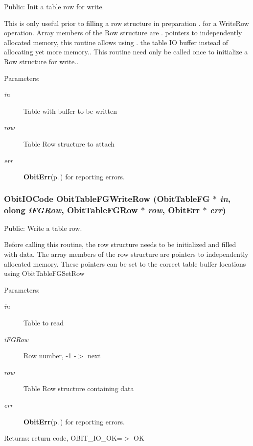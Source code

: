 Public: Init a table row for write. 

This is only useful prior to filling a row structure in preparation . for a Write\-Row operation. Array members of the Row structure are . pointers to independently allocated memory, this routine allows using . the table IO buffer instead of allocating yet more memory.. This routine need only be called once to initialize a Row structure for write.. \begin{Desc}
\item[Parameters:]
\begin{description}
\item[{\em in}]Table with buffer to be written \item[{\em row}]Table Row structure to attach \item[{\em err}]{\bf Obit\-Err}{\rm (p.\,\pageref{structObitErr})} for reporting errors. \end{description}
\end{Desc}
\subsubsection{\setlength{\rightskip}{0pt plus 5cm}Obit\-IOCode Obit\-Table\-FGWrite\-Row ({\bf Obit\-Table\-FG} $\ast$ {\em in}, {\bf olong} {\em i\-FGRow}, {\bf Obit\-Table\-FGRow} $\ast$ {\em row}, {\bf Obit\-Err} $\ast$ {\em err})}\label{ObitTableFG_8h_a20}


Public: Write a table row. 

Before calling this routine, the row structure needs to be initialized and filled with data. The array members of the row structure are pointers to independently allocated memory. These pointers can be set to the correct table buffer locations using Obit\-Table\-FGSet\-Row \begin{Desc}
\item[Parameters:]
\begin{description}
\item[{\em in}]Table to read \item[{\em i\-FGRow}]Row number, -1 -$>$ next \item[{\em row}]Table Row structure containing data \item[{\em err}]{\bf Obit\-Err}{\rm (p.\,\pageref{structObitErr})} for reporting errors. \end{description}
\end{Desc}
\begin{Desc}
\item[Returns:]return code, OBIT\_\-IO\_\-OK=$>$ OK \end{Desc}
